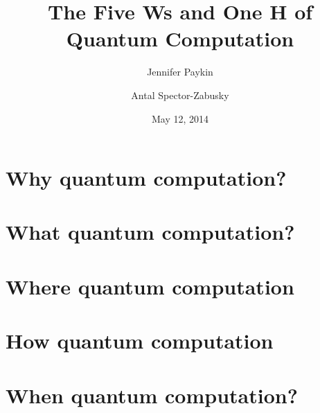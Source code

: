 \documentclass[12pt]{amsart}
\title{The Five Ws and One H of Quantum Computation}
\author{Jennifer Paykin \and Antal Spector-Zabusky}
\date{May 12, 2014}
\begin{document}
\maketitle

\section{Why quantum computation?}\label{sec:why}


\section{What quantum computation?}\label{sec:what}


\section{Where quantum computation}\label{sec:where}


\section{How quantum computation}\label{sec:how}


\section{When quantum computation?}\label{sec:when}


\def\refname{Who quantum computation}


\end{document}
